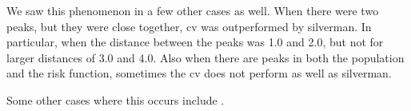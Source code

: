 We saw this phenomenon in a few other cases as well.
When there were two peaks, but they were close together, \gls{cv} was outperformed by \gls{silverman}.
In particular, when the distance between the peaks was 1.0 and 2.0, but not for larger distances of 3.0 and 4.0.
Also when there are peaks in both the population and the risk function, sometimes the \gls{cv} does not perform as well as \gls{silverman}.

Some other cases where this occurs include .